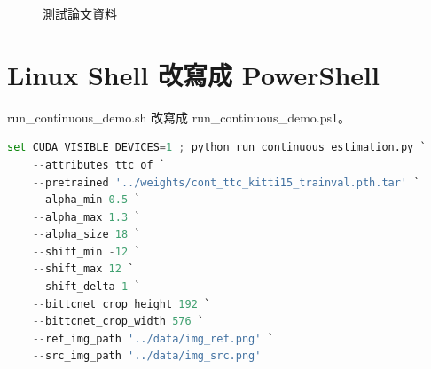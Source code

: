 \documentclass[10pt,UTF8]{ctexart}
\begin{document}
\begin{figure}[H]
\centering  %
\caption{測試論文資料}
\label{Fig.main}
\end{figure}

\newpage

\section{Linux Shell 改寫成 PowerShell}

run\_continuous\_demo.sh 改寫成 run\_continuous\_demo.ps1。

\begin{lstlisting}[language={python}]
set CUDA_VISIBLE_DEVICES=1 ; python run_continuous_estimation.py `
    --attributes ttc of `
    --pretrained '../weights/cont_ttc_kitti15_trainval.pth.tar' `
    --alpha_min 0.5 `
    --alpha_max 1.3 `
    --alpha_size 18 `
    --shift_min -12 `
    --shift_max 12 `
    --shift_delta 1 `
    --bittcnet_crop_height 192 `
    --bittcnet_crop_width 576 `
    --ref_img_path '../data/img_ref.png' `
    --src_img_path '../data/img_src.png'
\end{lstlisting}
\end{document}
